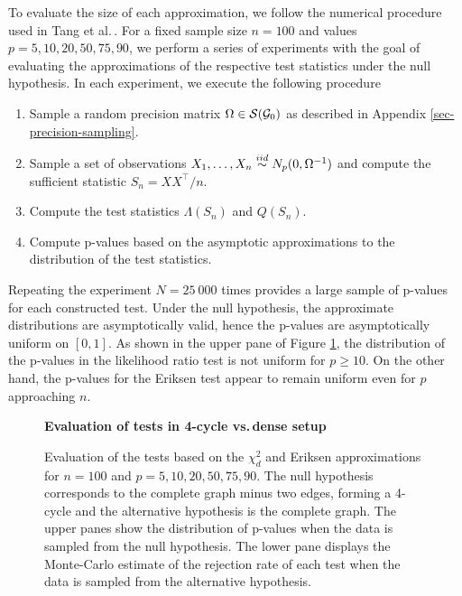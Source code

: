 To evaluate the size of each approximation, we follow the numerical procedure used in Tang et al.\,\cite{Tang2020}. For a fixed sample size $n = 100$ and values $p = 5, 10, 20, 50, 75, 90$, we perform a series of experiments with the goal of evaluating the approximations of the respective test statistics under the null hypothesis. In each experiment, we execute the following procedure
\begin{enumerate}
    \item Sample a random precision matrix $\Omega \in {\mathcal{S}}({\mathcal{G}}_0)$ as described in Appendix \ref{sec-precision-sampling}.
    \item Sample a set of observations $X_1, \ldots, X_n \stackrel{iid}{\sim} N_p(0, \Omega^{-1})$ and compute the sufficient statistic $S_n = X X^\top / n$.
    \item Compute the test statistics $\Lambda(S_n)$ and $Q(S_n)$.
    \item Compute p-values based on the asymptotic approximations to the distribution of the test statistics.
\end{enumerate}
Repeating the experiment $N = 25\ 000$ times provides a large sample of p-values for each constructed test. Under the null hypothesis, the approximate distributions are asymptotically valid, hence the p-values are asymptotically uniform on $[0, 1]$. As shown in the upper pane of Figure \ref{fig-complete-to-4cycle}, the distribution of the p-values in the likelihood ratio test is not uniform for $p \geq 10$. On the other hand, the p-values for the Eriksen test appear to remain uniform even for $p$ approaching $n$.

\begin{figure}[!tbp]
    \textbf{Evaluation of tests in 4-cycle vs.\,dense setup}
    \centering
    \qquad
    \caption{Evaluation of the tests based on the $\chi^2_d$ and Eriksen approximations for $n = 100$ and $p = 5, 10, 20, 50, 75, 90$. The null hypothesis corresponds to the complete graph minus two edges, forming a 4-cycle and the alternative hypothesis is the complete graph. The upper panes show the distribution of p-values when the data is sampled from the null hypothesis. The lower pane displays the Monte-Carlo estimate of the rejection rate of each test when the data is sampled from the alternative hypothesis.}
    \label{fig-complete-to-4cycle}
\end{figure}


